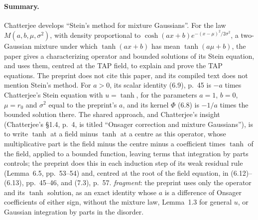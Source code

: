 \documentclass[11pt]{article}
\newcommand{\ploc}[2]{#1}
\newcommand{\sloc}[2]{\cite[#2]{#1}}
\newcommand{\rel}[1]{\textit{#1}}
\begin{document}
\paragraph{Summary.}
Chatterjee \sloc{Chatterjee2007-SpinGlassesSteinsMethod}{\S1.8 and Lemma~1.3, pp.~7--8}
develops ``Stein's method for mixture Gaussians''. For the law
$M(a,b,\mu,\sigma^2)$, with density proportional to
$\cosh(ax+b)e^{-(x-\mu)^2/2\sigma^2}$, a two-Gaussian mixture under which
$\tanh(ax+b)$ has mean $\tanh(a\mu+b)$, the paper gives a characterizing operator and
bounded solutions of its Stein equation, and uses them, centred at the TAP
field, to explain and prove the TAP equations. The preprint does not cite this
paper, and its compiled text does not mention Stein's method. For $a>0$, its
scalar identity \ploc{(6.9), p.~45}{residuals.tex:255--260} is $-a$ times
Chatterjee's Stein equation with $u=\tanh$, for the parameters $a=1$, $b=0$, $\mu=r_0$
and $\sigma^2$ equal to the preprint's $a$, and its kernel $\Phi$
\ploc{(6.8)}{residuals.tex:249--254} is $-1/a$ times the bounded solution there.
The shared approach, and Chatterjee's insight (Chatterjee's \S1.4, p.~4, is titled
``Onsager correction and mixture Gaussians''), is to write $\tanh$ at a field
minus $\tanh$ at a centre as this operator, whose multiplicative part is the
field minus the centre minus a coefficient times $\tanh$ of the field, applied
to a bounded function, leaving terms that integration by parts controls; the
preprint does this in each induction step of its weak residual rule
\ploc{(Lemma~6.5, pp.~53--54)}{residuals.tex:886--1032} and, centred at the
root of the field equation, in
\ploc{(6.12)--(6.13), pp.~45--46,}{residuals.tex:316--342} and
\ploc{(7.3), p.~57}{consequences.tex:113--132}. \rel{fragment}: the preprint
uses only the operator and its $\tanh$ solution, as an exact identity whose
$a$ is a difference of Onsager coefficients of either sign, without the
mixture law, Lemma~1.3 for general $u$, or Gaussian integration by parts in
the disorder.
\end{document}

